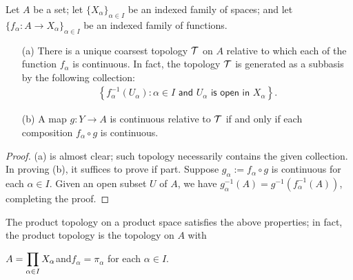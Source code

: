 \begin{thm}
    Let $A$ be a set; let $\{X_\alpha\}_{\alpha\in I}$ be an indexed family of spaces; and let $\{f_\alpha: A\rightarrow X_\alpha\}_{\alpha\in I}$ be an indexed family of functions.
    \begin{enumerate}
        \item[(a)]
        {
            There is a unique coarsest topology ${\mathcal{T}}$ on $A$ relative to which each of the function $f_\alpha$ is continuous. In fact, the topology ${\mathcal{T}}$ is generated as a subbasis by the following collection:
            \begin{align*}
                \left\{f_\alpha^{-1}(U_\alpha)
                :
                \alpha\in I\textsf{ and }U_\alpha\textsf{ is open in }X_\alpha\right\}.
            \end{align*}
        }
        \item[(b)]
        {
            A map $g: Y\rightarrow A$ is continuous relative to ${\mathcal{T}}$ if and only if each composition $f_\alpha\circ g$ is continuous.
        }
    \end{enumerate}
\end{thm}
\begin{proof}
    (a) is almost clear; such topology necessarily contains the given collection.
    In proving (b), it suffices to prove if part.
    Suppose $g_\alpha:=f_\alpha\circ g$ is continuous for each $\alpha\in I$.
    Given an open subset $U$ of $A$, we have $g_\alpha^{-1}(A)=g^{-1}(f_\alpha^{-1}(A))$, completing the proof.
\end{proof}
\begin{rmk}
    The product topology on a product space satisfies the above properties; in fact, the product topology is the topology on $A$ with
    \begin{center}
        $\displaystyle{A=\prod_{\alpha\in I}X_\alpha}$\quad and\quad$f_\alpha=\pi_\alpha$ for each $\alpha\in I$.
    \end{center}
\end{rmk}

